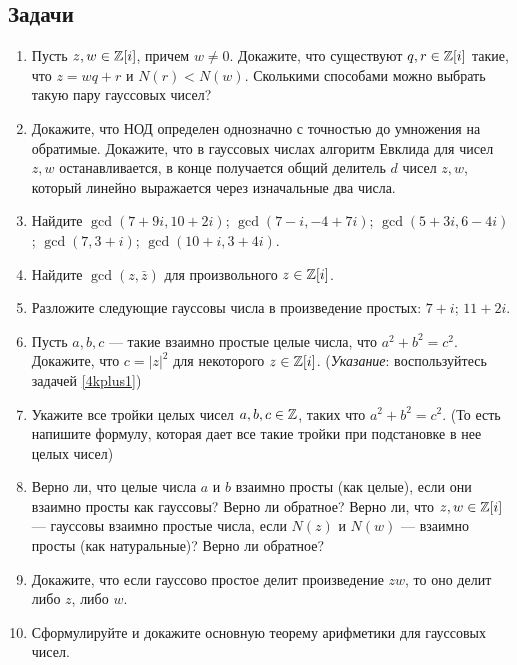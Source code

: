 \subsection*{Задачи}


\begin{enumerate}
\item Пусть $z, w \in \mathbb Z[i]$, причем $w\ne 0$.
\ipunkt Докажите, что существуют $q, r \in \mathbb Z[i]$ такие, что $z = wq + r$ и $N(r) < N(w)$.
\ipunkt Сколькими способами можно выбрать такую пару гауссовых чисел?


\item \ipunkt  Докажите, что НОД определен однозначно с точностью до умножения на обратимые.
\ipunkt Докажите, что в гауссовых числах алгоритм Евклида
 для чисел $z, w$ останавливается, в конце получается общий делитель
 $d$ чисел $z, w$, который линейно выражается через изначальные два числа.

\item Найдите \ipunkt $\gcd(7 + 9i, 10 + 2i)$;
\ipunkt $\gcd(7 - i, -4 + 7i)$; \ipunkt $\gcd(5 + 3i, 6 - 4i)$;
\ipunkt $\gcd(7, 3 + i)$; \ipunkt $\gcd(10 + i,3 + 4i)$.

\item Найдите $\gcd(z, \bar z)$ для произвольного $z \in \mathbb Z[i]$.

\item Разложите следующие гауссовы числа в произведение простых: $7 + i$; $11 + 2i$.
\item Пусть $a, b, c$ --- такие взаимно простые целые числа, что
$a^2 +b^2 = c^2$. Докажите, что $c = |z|^2$ для некоторого $z \in \mathbb Z[i]$. (\textit{Указание}: воспользуйтесь задачей \ref{4kplus1})
\item Укажите все тройки целых чисел $a, b, c \in \mathbb Z$, таких что $a^2 +b^2 =c^2$.
(То есть напишите формулу, которая дает все такие тройки при
подстановке в нее целых чисел)

\item \ipunkt Верно ли, что целые числа $a$ и $b$ взаимно просты (как целые), если они взаимно просты
как гауссовы? \ipunkt Верно ли обратное? \ipunkt Верно ли, что $z, w \in \mathbb Z[i]$ --- гауссовы взаимно простые числа,
если $N(z)$ и $N(w)$ --- взаимно просты (как натуральные)? \ipunkt Верно ли обратное?
\item Докажите, что если гауссово простое делит произведение $zw$, то оно делит либо $z$, либо $w$.
\item Сформулируйте и докажите основную теорему арифметики для гауссовых чисел.

\end{enumerate}







